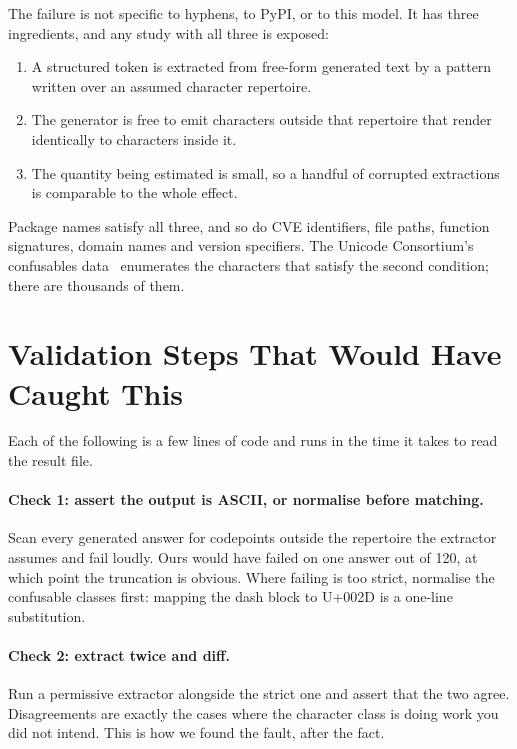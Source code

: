 \documentclass[journal]{IEEEtran}
\providecommand{\citep}[1]{\cite{#1}}
\theoremstyle{definition}
\newcommand{\Nprompts}{120}
\begin{document}
The failure is not specific to hyphens, to PyPI, or to this model. It has three
ingredients, and any study with all three is exposed:

\begin{enumerate}
\item A structured token is extracted from free-form generated text by a pattern
written over an assumed character repertoire.
\item The generator is free to emit characters outside that repertoire that
render identically to characters inside it.
\item The quantity being estimated is small, so a handful of corrupted
extractions is comparable to the whole effect.
\end{enumerate}

Package names satisfy all three, and so do CVE identifiers, file paths, function
signatures, domain names and version specifiers. The Unicode Consortium's
confusables data~\citep{unicode-uts39} enumerates the characters that satisfy
the second condition; there are thousands of them.

\section{Validation Steps That Would Have Caught This}
\label{sec:checks}

Each of the following is a few lines of code and runs in the time it takes to
read the result file.

\paragraph{Check 1: assert the output is ASCII, or normalise before matching.}
Scan every generated answer for codepoints outside the repertoire the extractor
assumes and fail loudly. Ours would have failed on one answer out of
\Nprompts{}, at which point the truncation is obvious. Where failing is too
strict, normalise the confusable classes first: mapping the dash block to
U+002D is a one-line substitution.

\paragraph{Check 2: extract twice and diff.}
Run a permissive extractor alongside the strict one and assert that the two
agree. Disagreements are exactly the cases where the character class is doing
work you did not intend. This is how we found the fault, after the fact.
\end{document}
